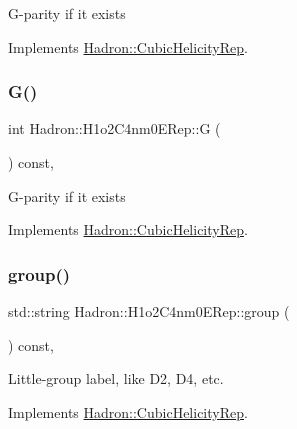 G-\/parity if it exists 

Implements \mbox{\hyperlink{structHadron_1_1CubicHelicityRep_a50689f42be1e6170aa8cf6ad0597018b}{Hadron\+::\+Cubic\+Helicity\+Rep}}.

\mbox{\label{structHadron_1_1H1o2C4nm0ERep_a27d3efda696f16d6a2aa6ed3c3a9daf9}} 
\subsubsection{\texorpdfstring{G()}{G()}\hspace{0.1cm}{\footnotesize\ttfamily [2/2]}}
{\footnotesize\ttfamily int Hadron\+::\+H1o2\+C4nm0\+E\+Rep\+::G (\begin{DoxyParamCaption}{ }\end{DoxyParamCaption}) const\hspace{0.3cm}{\ttfamily [inline]}, {\ttfamily [virtual]}}

G-\/parity if it exists 

Implements \mbox{\hyperlink{structHadron_1_1CubicHelicityRep_a50689f42be1e6170aa8cf6ad0597018b}{Hadron\+::\+Cubic\+Helicity\+Rep}}.

\mbox{\label{structHadron_1_1H1o2C4nm0ERep_a36a640810282f46b74dffd59f917c4cd}} 
\subsubsection{\texorpdfstring{group()}{group()}\hspace{0.1cm}{\footnotesize\ttfamily [1/2]}}
{\footnotesize\ttfamily std\+::string Hadron\+::\+H1o2\+C4nm0\+E\+Rep\+::group (\begin{DoxyParamCaption}{ }\end{DoxyParamCaption}) const\hspace{0.3cm}{\ttfamily [inline]}, {\ttfamily [virtual]}}

Little-\/group label, like D2, D4, etc. 

Implements \mbox{\hyperlink{structHadron_1_1CubicHelicityRep_a101a7d76cd8ccdad0f272db44b766113}{Hadron\+::\+Cubic\+Helicity\+Rep}}.

\mbox{\label{structHadron_1_1H1o2C4nm0ERep_a36a640810282f46b74dffd59f917c4cd}} 
